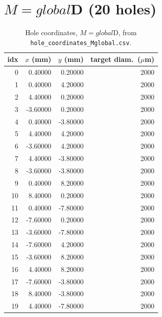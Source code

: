 \section{$M=global$D (20 holes)}
\begin{longtable}{rrrr}
\caption{Hole coordinates, $M=global$D, from \texttt{hole\_coordinates\_Mglobal.csv}.}\\
\toprule
idx & $x$ (mm) & $y$ (mm) & target diam.\ ($\mu$m) \\
\midrule
\endhead
0 & 0.40000 & 0.20000 & 2000 \\
1 & 0.40000 & 4.20000 & 2000 \\
2 & 4.40000 & 0.20000 & 2000 \\
3 & -3.60000 & 0.20000 & 2000 \\
4 & 0.40000 & -3.80000 & 2000 \\
5 & 4.40000 & 4.20000 & 2000 \\
6 & -3.60000 & 4.20000 & 2000 \\
7 & 4.40000 & -3.80000 & 2000 \\
8 & -3.60000 & -3.80000 & 2000 \\
9 & 0.40000 & 8.20000 & 2000 \\
10 & 8.40000 & 0.20000 & 2000 \\
11 & 0.40000 & -7.80000 & 2000 \\
12 & -7.60000 & 0.20000 & 2000 \\
13 & -3.60000 & -7.80000 & 2000 \\
14 & -7.60000 & 4.20000 & 2000 \\
15 & -3.60000 & 8.20000 & 2000 \\
16 & 4.40000 & 8.20000 & 2000 \\
17 & -7.60000 & -3.80000 & 2000 \\
18 & 8.40000 & -3.80000 & 2000 \\
19 & 4.40000 & -7.80000 & 2000 \\
\bottomrule
\end{longtable}
